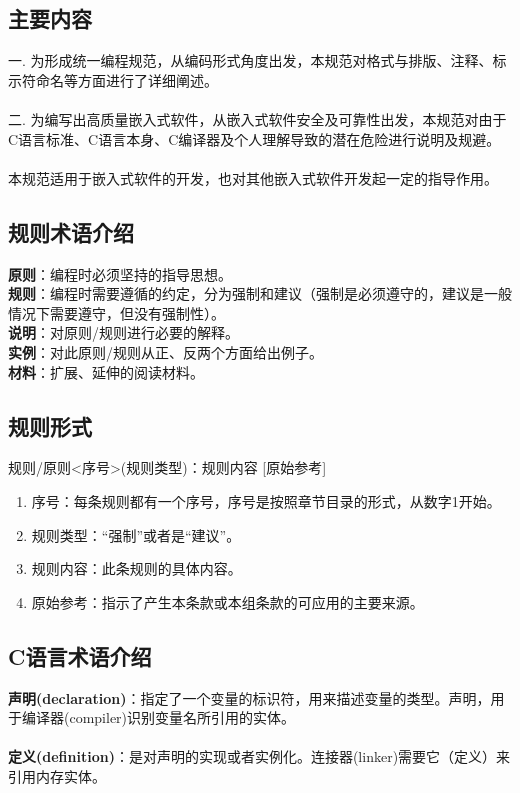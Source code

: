 \documentclass[UTF8,a4paper,12pt]{article}
\begin{document}
	\subsection{主要内容}
	一. 为形成统一编程规范，从编码形式角度出发，本规范对格式与排版、注释、标示符命名等方面进行了详细阐述。\\
	\\
	二. 为编写出高质量嵌入式软件，从嵌入式软件安全及可靠性出发，本规范对由于C语言标准、C语言本身、C编译器及个人理解导致的潜在危险进行说明及规避。\\
	\\
	本规范适用于嵌入式软件的开发，也对其他嵌入式软件开发起一定的指导作用。\\
	
	\subsection{规则术语介绍}
	\textbf{原则}：编程时必须坚持的指导思想。\\
	\textbf{规则}：编程时需要遵循的约定，分为强制和建议（强制是必须遵守的，建议是一般情况下需要遵守，但没有强制性）。\\
	\textbf{说明}：对原则/规则进行必要的解释。\\
	\textbf{实例}：对此原则/规则从正、反两个方面给出例子。\\
	\textbf{材料}：扩展、延伸的阅读材料。\\
	
	\subsection{规则形式}
	\centerline{规则/原则<序号>(规则类型)：规则内容 [原始参考]}
	\begin{enumerate}
	\item 序号：每条规则都有一个序号，序号是按照章节目录的形式，从数字1开始。
	\item 规则类型：“强制”或者是“建议”。
	\item 规则内容：此条规则的具体内容。
	\item 原始参考：指示了产生本条款或本组条款的可应用的主要来源。
	\end{enumerate}

	\subsection{C语言术语介绍}
	\textbf{声明(declaration)}：指定了一个变量的标识符，用来描述变量的类型。声明，用于编译器(compiler)识别变量名所引用的实体。\\
	\\
	\textbf{定义(definition)}：是对声明的实现或者实例化。连接器(linker)需要它（定义）来引用内存实体。\\
\end{document}

